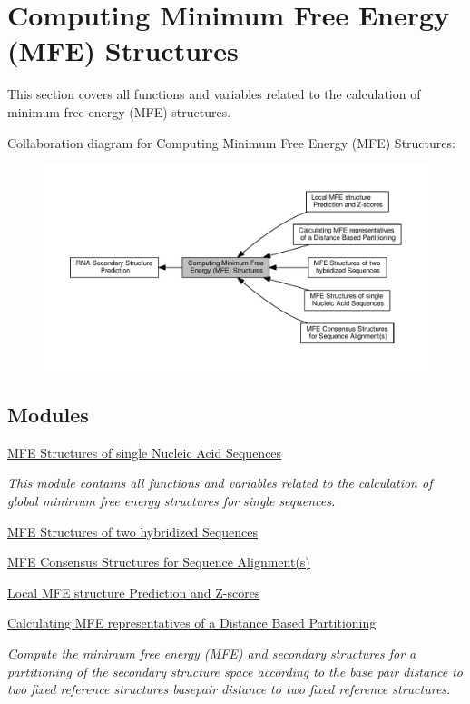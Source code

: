 \hypertarget{group__mfe__fold}{}\section{Computing Minimum Free Energy (M\+FE) Structures}
\label{group__mfe__fold}


This section covers all functions and variables related to the calculation of minimum free energy (M\+FE) structures.  


Collaboration diagram for Computing Minimum Free Energy (M\+FE) Structures\+:
\nopagebreak
\begin{figure}[H]
\begin{center}
\leavevmode
\includegraphics[width=350pt]{group__mfe__fold}
\end{center}
\end{figure}
\subsection*{Modules}
\begin{DoxyCompactItemize}
\item 
\hyperlink{group__mfe__fold__single}{M\+F\+E Structures of single Nucleic Acid Sequences}
\begin{DoxyCompactList}\small\item\em This module contains all functions and variables related to the calculation of global minimum free energy structures for single sequences. \end{DoxyCompactList}\item 
\hyperlink{group__mfe__cofold}{M\+F\+E Structures of two hybridized Sequences}
\item 
\hyperlink{group__consensus__mfe__fold}{M\+F\+E Consensus Structures for Sequence Alignment(s)}
\item 
\hyperlink{group__local__mfe__fold}{Local M\+F\+E structure Prediction and Z-\/scores}
\item 
\hyperlink{group__kl__neighborhood__mfe}{Calculating M\+F\+E representatives of a Distance Based Partitioning}
\begin{DoxyCompactList}\small\item\em Compute the minimum free energy (M\+FE) and secondary structures for a partitioning of the secondary structure space according to the base pair distance to two fixed reference structures basepair distance to two fixed reference structures. \end{DoxyCompactList}\end{DoxyCompactItemize}
